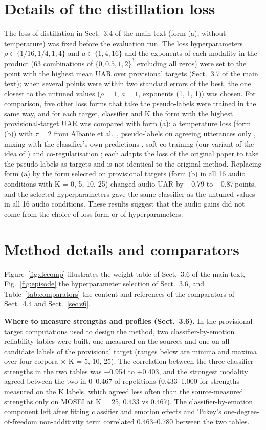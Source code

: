 \documentclass[sn-nature,pdflatex]{sn-jnl}
\newcommand{\pt}{\,points}
\begin{document}
\section{Details of the distillation loss}\label{sec:s4}
The loss of distillation in Sect.~3.4 of the main text (form (a), without temperature) was fixed before the evaluation run. The loss hyperparameters $\rho\in\{1/16,1/4,1,4\}$ and $a\in\{1,4,16\}$ and the exponents of each modality in the product (63 combinations of $\{0,0.5,1,2\}^3$ excluding all zeros) were set to the point with the highest mean UAR over provisional targets (Sect.~3.7 of the main text); when several points were within two standard errors of the best, the one closest to the untuned values ($\rho=1$, $a=1$, exponents (1, 1, 1)) was chosen. For comparison, five other loss forms that take the pseudo-labels were trained in the same way, and for each target, classifier and K the form with the highest provisional-target UAR was compared with form (a): a temperature loss (form (b)) \cite{hinton2015distilling} with $\tau=2$ from Albanie et al.\ \cite{albanie2018}, pseudo-labels on agreeing utterances only \cite{shi2024audioguided}, mixing with the classifier's own predictions \cite{zhang2021combining}, soft co-training (our variant of the idea of \cite{blum1998}) and co-regularisation \cite{sindhwani2005coreg}; each adapts the loss of the original paper to take the pseudo-labels as targets and is not identical to the original method. Replacing form (a) by the form selected on provisional targets (form (b) in all 16 audio conditions with K = 0, 5, 10, 25) changed audio UAR by $-$0.79 to +0.87\pt, and the selected hyperparameters gave the same classifier as the untuned values in all 16 audio conditions. These results suggest that the audio gains did not come from the choice of loss form or of hyperparameters.

\section{Method details and comparators}\label{sec:s5}
Figure~\ref{fig:decomp} illustrates the weight table of Sect.~3.6 of the main text, Fig.~\ref{fig:episode} the hyperparameter selection of Sect.~3.6, and Table~\ref{tab:comparators} the content and references of the comparators of Sect.~4.4 and Sect.~\ref{sec:s6}.

\textbf{Where to measure strengths and profiles (Sect.~3.6).} In the provisional-target computations used to design the method, two classifier-by-emotion reliability tables were built, one measured on the sources and one on all candidate labels of the provisional target (ranges below are minima and maxima over four corpora $\times$ K = 5, 10, 25). The correlation between the three classifier strengths in the two tables was $-$0.954 to +0.403, and the strongest modality agreed between the two in 0--0.467 of repetitions (0.433--1.000 for strengths measured on the K labels, which agreed less often than the source-measured strengths only on MOSEI at K = 25, 0.433 vs 0.467). The classifier-by-emotion component left after fitting classifier and emotion effects and Tukey's one-degree-of-freedom non-additivity term \cite{tukey1949} correlated 0.463--0.780 between the two tables.
\end{document}
